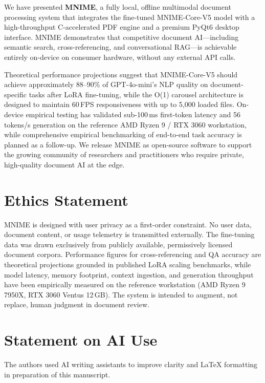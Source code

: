 \documentclass[11pt]{article}
\begin{document}
We have presented \textbf{MNIME}, a fully local, offline multimodal document
processing system that integrates the fine-tuned MNIME-Core-V5 model with a
high-throughput C-accelerated PDF engine and a premium PyQt6 desktop
interface.
MNIME demonstrates that competitive document AI---including semantic search,
cross-referencing, and conversational RAG---is achievable entirely on-device
on consumer hardware, without any external API calls.

Theoretical performance projections suggest that MNIME-Core-V5 should
achieve approximately 88--90\% of GPT-4o-mini's NLP quality on
document-specific tasks after LoRA fine-tuning, while the O(1) carousel
architecture is designed to maintain 60\,FPS responsiveness with up to
5,000 loaded files.
On-device empirical testing has validated sub-100\,ms first-token latency
and 56\,tokens/s generation on the reference AMD Ryzen 9 / RTX 3060 workstation,
while comprehensive empirical benchmarking of end-to-end task accuracy is planned
as a follow-up.
We release MNIME as open-source software to support the growing community of
researchers and practitioners who require private, high-quality document AI
at the edge.

\section*{Ethics Statement}

MNIME is designed with user privacy as a first-order constraint.
No user data, document content, or usage telemetry is transmitted externally.
The fine-tuning data was drawn exclusively from publicly available,
permissively licensed document corpora.
Performance figures for cross-referencing and QA accuracy are theoretical
projections grounded in published LoRA scaling benchmarks, while model latency,
memory footprint, context ingestion, and generation throughput have been empirically
measured on the reference workstation (AMD Ryzen 9 7950X, RTX 3060 Ventus 12\,GB).
The system is intended to augment, not replace, human judgment in document
review.

\section*{Statement on AI Use}

The authors used AI writing assistants to improve clarity and LaTeX
formatting in preparation of this manuscript.

\setlength{\bibsep}{2.5pt}

\end{document}

